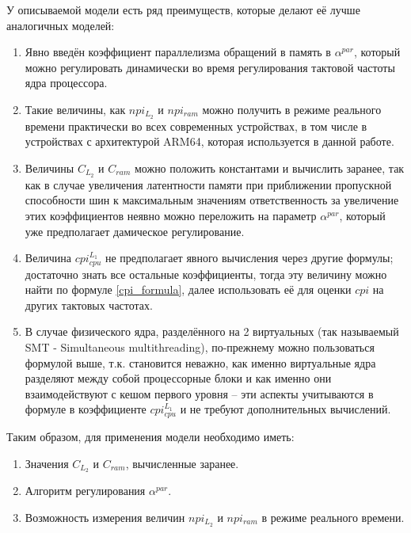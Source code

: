     У описываемой модели есть ряд преимуществ, которые делают её лучше аналогичных моделей:
    \begin{enumerate}
        \item Явно введён коэффициент параллелизма обращений в память в $\alpha^{par}$, который можно
        регулировать динамически во время регулирования тактовой частоты ядра процессора.
        \item Такие величины, как $npi_{L_2}$ и $npi_{ram}$ можно получить в режиме реального времени
        практически во всех современных устройствах, в том числе в устройствах с архитектурой ARM64,
        которая используется в данной работе.
        \item Величины $C_{L_2}$ и $C_{ram}$ можно положить константами и вычислить заранее, так как
        в случае увеличения латентности памяти при приближении пропускной способности шин к максимальным
        значениям ответственность за увеличение этих коэффициентов неявно можно переложить на параметр
        $\alpha^{par}$, который уже предполагает дамическое регулирование.
        \item Величина $cpi_{cpu}^{L_1}$ не предполагает явного вычисления через другие формулы;
        достаточно знать все остальные коэффициенты, тогда эту величину можно найти по формуле
        \eqref{cpi_formula}, далее использовать её для оценки $cpi$ на других тактовых частотах.
        \item В случае физического ядра, разделённого на 2 виртуальных (так называемый
        SMT - Simultaneous multithreading), по-прежнему можно пользоваться формулой выше, т.к.
        становится неважно, как именно виртуальные ядра разделяют между собой процессорные блоки
        и как именно они взаимодействуют с кешом первого уровня -- эти аспекты учитываются
        в формуле в коэффициенте $cpi_{cpu}^{L_1}$ и не требуют дополнительных вычислений.
    \end{enumerate}

    Таким образом, для применения модели необходимо иметь:
    \begin{enumerate}
        \item Значения $C_{L_2}$ и $C_{ram}$, вычисленные заранее.
        \item Алгоритм регулирования $\alpha^{par}$.
        \item Возможность измерения величин $npi_{L_2}$ и $npi_{ram}$ в режиме реального времени.
    \end{enumerate}



